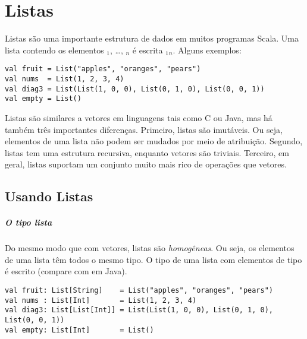\chapter{Listas}

Listas são uma importante estrutura de dados em muitos programas Scala. Uma 
lista contendo os elementos $_1$, \ldots, $_n$ é escrita
$_1$$_n$\code{)}. Alguns exemplos:

\begin{lstlisting}
val fruit = List("apples", "oranges", "pears")
val nums  = List(1, 2, 3, 4)
val diag3 = List(List(1, 0, 0), List(0, 1, 0), List(0, 0, 1))
val empty = List()
\end{lstlisting}

Listas são similares a vetores em linguagens tais como C ou Java, mas há 
também três importantes diferenças. Primeiro, listas são imutáveis. Ou seja, 
elementos de uma lista não podem ser mudados por meio de atribuição. Segundo, 
listas tem uma estrutura recursiva, enquanto vetores são triviais. Terceiro, 
em geral, listas suportam um conjunto muito mais rico de operações que vetores. 
 
\section{Usando Listas}

\paragraph{O tipo lista}

Do mesmo modo que com vetores, listas são {\em homogêneas}. Ou seja, os elementos 
de uma lista têm todos o mesmo tipo. O tipo de uma lista com elementos de tipo 
 é escrito  (compare com  em Java).

\begin{lstlisting}
val fruit: List[String]    = List("apples", "oranges", "pears")
val nums : List[Int]       = List(1, 2, 3, 4)
val diag3: List[List[Int]] = List(List(1, 0, 0), List(0, 1, 0), List(0, 0, 1))
val empty: List[Int]       = List()
\end{lstlisting}


